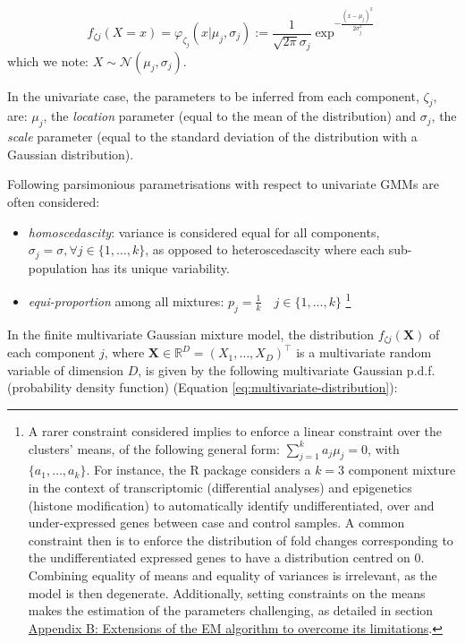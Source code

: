 \begin{equation}
f_{\zeta j}(X=x)=\varphi_{\zeta_j}(x | \mu_j, \sigma_j):=\frac{1}{\sqrt{2\pi} \sigma_j} \exp^{- \frac{(x - \mu_j)^2}{2 \sigma_j^2}}
\label{eq:gaussian-dist}
\end{equation} which we note: \(X \sim \mathcal{N}(\mu_j, \sigma_j)\).

In the univariate case, the parameters to be inferred from each
component, \(\zeta_j\), are: \(\mu_j\), the \emph{location} parameter (equal to
the mean of the distribution) and \(\sigma_j\), the \emph{scale} parameter
(equal to the standard deviation of the distribution with a Gaussian distribution).

Following parsimonious parametrisations with respect to univariate GMMs
are often considered:

\begin{itemize}
\item
  \emph{homoscedascity}: variance is considered equal for all components,
  \(\sigma_j = \sigma, \forall j \in \{1, \ldots, k \}\), as opposed to
  heteroscedascity where each sub-population has its unique
  variability.
\item
  \emph{equi-proportion} among all mixtures:
  \(p_j = \frac{1}{k} \quad j \in \{ 1, \ldots, k\}\) \footnote{A rarer constraint considered implies to enforce a linear
    constraint over the clusters' means, of the following general form:
    \(\sum_{j=1}^k a_j \mu_j=0\), with \(\{a_1, \ldots, a_k\}\). For
    instance, the R package  considers a \(k=3\) component
    mixture in the context of transcriptomic (differential analyses) and
    epigenetics (histone modification) to automatically identify
    undifferentiated, over and under-expressed genes between case and
    control samples. A common constraint then is to enforce the
    distribution of fold changes corresponding to the undifferentiated
    expressed genes to have a distribution centred on 0. Combining
    equality of means and equality of variances is irrelevant, as the
    model is then degenerate. Additionally, setting constraints on the
    means makes the estimation of the parameters challenging, as
    detailed in section \protect\hyperlink{appendix-b-extensions-of-the-em-algorithm-to-overcome-its-limitations}{Appendix B: Extensions of the EM algorithm to overcome its limitations}.}
\end{itemize}

In the finite multivariate Gaussian mixture model, the distribution \(f_{\zeta j}(\boldsymbol{X})\) of each component \(j\), where
\(\boldsymbol{X} \in \mathbb{R}^D =(X_1, \ldots, X_D)^\top\) is a multivariate random variable
of dimension \(D\), is given by the
following multivariate Gaussian p.d.f. (probability density function)
(Equation \eqref{eq:multivariate-distribution}):

